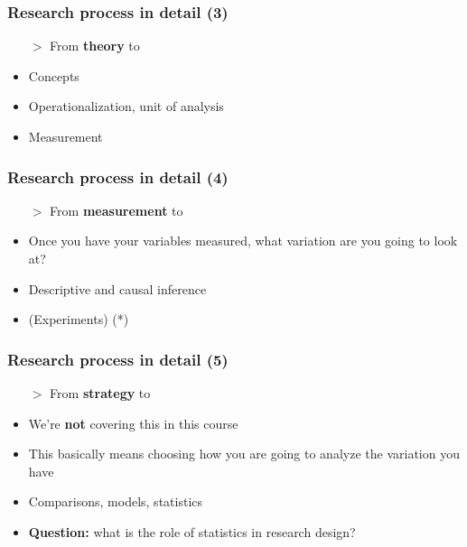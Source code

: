 \documentclass[aspectratio=43]{beamer}
\begin{document}
\begin{frame}
\frametitle{Research process in detail (3)}
\centering

\begin{itemize}
  \item[$>$] From \textbf{theory} to 
  \item[]
  \item<2-> Concepts
  \item<3-> Operationalization, unit of analysis
  \item<4-> Measurement
\end{itemize}

\end{frame}

\begin{frame}
\frametitle{Research process in detail (4)}
\centering

\begin{itemize}
  \item[$>$] From \textbf{measurement} to 
  \item[]
  \item Once you have your variables measured, what variation are you going to look at?
  \item Descriptive and causal inference
  \item (Experiments) (*)
\end{itemize}

\end{frame}

\begin{frame}
\frametitle{Research process in detail (5)}
\centering

\begin{itemize}
  \item[$>$] From \textbf{strategy} to 
  \item[]
  \item We're \textbf{not} covering this in this course
  \item This basically means choosing how you are going to analyze the variation you have
  \item Comparisons, models, statistics
  \item \textbf{Question:} what is the role of statistics in research design?
\end{itemize}

\end{frame}
\end{document}
